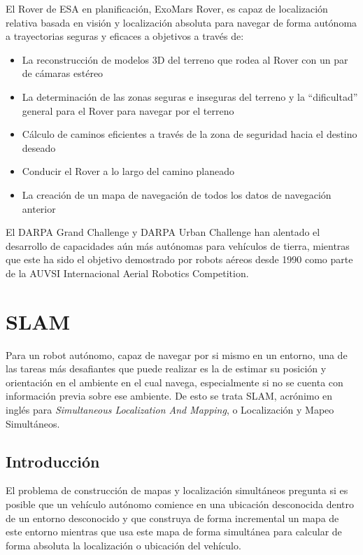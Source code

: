 El Rover de ESA en planificación, ExoMars Rover, es capaz de localización relativa basada en visión y localización absoluta para navegar de forma autónoma a trayectorias seguras y eficaces a objetivos a través de:

\begin{itemize}
	\itemsep1pt \parskip1pt 
	\item La reconstrucción de modelos 3D del terreno que rodea al Rover con un par de cámaras estéreo
	\item La determinación de las zonas seguras e inseguras del terreno y la ``dificultad'' general para el Rover para navegar por el terreno
	\item Cálculo de caminos eficientes a través de la zona de seguridad hacia el destino deseado
	\item Conducir el Rover a lo largo del camino planeado
	\item La creación de un mapa de navegación de todos los datos de navegación anterior
\end{itemize}

El DARPA Grand Challenge y DARPA Urban Challenge han alentado el desarrollo de capacidades aún más autónomas para vehículos de tierra, mientras que este ha sido el objetivo demostrado por robots aéreos desde 1990 como parte de la AUVSI Internacional Aerial Robotics Competition.

\section{SLAM}
Para un robot autónomo, capaz de navegar por si mismo en un entorno, una de las tareas más desafiantes que puede realizar es la de estimar su posición y orientación en el ambiente en el cual navega, especialmente si no se cuenta con información previa sobre ese ambiente. De esto se trata SLAM, acrónimo en inglés para \textit{Simultaneous Localization And Mapping}, o Localización y Mapeo Simultáneos.

\subsection{Introducción}
El problema de construcción de mapas y localización simultáneos pregunta si es posible que un vehículo autónomo comience en una ubicación desconocida dentro de un entorno desconocido y que construya de forma incremental un mapa de este entorno mientras que usa este mapa de forma simultánea para calcular de forma absoluta la localización o ubicación del vehículo.

